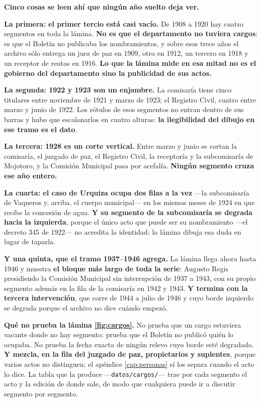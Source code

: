 \begin{cautela}
\textbf{Cinco cosas se leen ahí que ningún año suelto deja ver.}

\textbf{La primera: el primer tercio está casi vacío.} De 1908 a 1920 hay cuatro segmentos en
toda la lámina. \textbf{No es que el departamento no tuviera cargos}: es que el Boletín no
publicaba los nombramientos, y sobre esos trece años el archivo sólo entrega un juez de paz en
1909, otro en 1912, un tercero en 1918 y un receptor de rentas en 1916. \textbf{Lo que la lámina
mide en esa mitad no es el gobierno del departamento sino la publicidad de sus actos.}

\textbf{La segunda: 1922 y 1923 son un enjambre.} La comisaría tiene cinco titulares entre
noviembre de 1921 y marzo de 1923; el Registro Civil, cuatro entre marzo y junio de 1922. Los
rótulos de esos segmentos no entran dentro de sus barras y hubo que escalonarlos en cuatro
alturas: \textbf{la ilegibilidad del dibujo en ese tramo es el dato}.

\textbf{La tercera: 1928 es un corte vertical.} Entre marzo y junio se cortan la comisaría, el
juzgado de paz, el Registro Civil, la receptoría y la subcomisaría de Mojotoro, y la Comisión
Municipal pasa por acefalía. \textbf{Ningún segmento cruza ese año entero.}

\textbf{La cuarta: el caso de Urquiza ocupa dos filas a la vez}
---la subcomisaría de Vaqueros y, arriba, el cuerpo municipal--- en los mismos meses de 1924 en
que recibe la concesión de agua. \textbf{Y su segmento de la subcomisaría se degrada hacia la
izquierda}, porque el único acto que puede ser su nombramiento ---el decreto 345 de 1922--- no
acredita la identidad: la lámina dibuja esa duda en lugar de taparla.

\textbf{Y una quinta, que el tramo 1937--1946 agrega.} La lámina llega ahora hasta 1946 y
muestra \textbf{el bloque más largo de toda la serie}: Augusto Regis
presidiendo la Comisión Municipal sin interrupción de 1937 a 1943, con su propio segmento
además en la fila de la comisaría en 1942 y 1943. \textbf{Y termina con la tercera
intervención}, que corre de 1944 a julio de 1946 y cuyo borde izquierdo se degrada porque el
archivo no dice cuándo empezó.
\end{cautela}

\begin{cautela}
\textbf{Qué no prueba la lámina \ref{fig:cargos}.} No prueba que un cargo estuviera vacante donde
no hay segmento: prueba que el Boletín no publicó quién lo ocupaba. No prueba la fecha exacta de
ningún relevo cuyo borde esté degradado. \textbf{Y mezcla, en la fila del juzgado de paz,
propietarios y suplentes}, porque varios actos no distinguen; el apéndice \ref{cap:personas} sí
los separa cuando el acto lo dice. La tabla que la produce ---\texttt{datos/cargos/}--- trae por
cada segmento el acto y la edición de donde sale, de modo que cualquiera puede ir a discutir
segmento por segmento.
\end{cautela}

